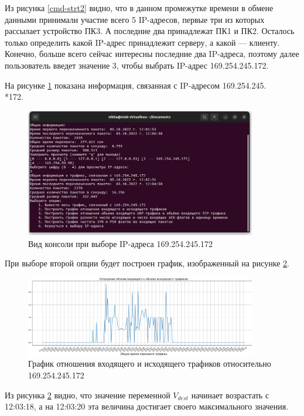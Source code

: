 \documentclass[bachelor, och, coursework]{SCWorks}
\begin{document}
  Из рисунка \ref{cmd-strt2} видно, что в данном промежутке времени в обмене данными принимали участие всего 5 IP-адресов, первые три из которых рассылает
  устройство ПК3. А последние два принадлежат ПК1 и ПК2. Осталось только определить какой IP-адрес принадлежит серверу, а какой --- клиенту. Конечно, больше
  всего сейчас интересны последние два IP-адреса, поэтому далее пользователь введет значение 3, чтобы выбрать IP-адрес 169.254.245.172.

  На рисунке \ref{chmod} показана информация, связанная с IP-адресом 169.254.245.\\*172.

  \begin{figure}[H]
    \centering
    \includegraphics[width=0.9\textwidth]{photo/choose-mode.jpg}
    \caption{Вид консоли при выборе IP-адреса 169.254.245.172}
    \label{chmod}
  \end{figure}

  При выборе второй опции будет построен график, изображенный на рисунке \ref{clnt1}.

  \begin{figure}[H]
    \centering
    \includegraphics[width=0.9\textwidth]{photo/clnt1.png}
    \caption{График отношения входящего и исходящего трафиков относительно 169.254.245.172}
    \label{clnt1}
  \end{figure}

  Из рисунка \ref{clnt1} видно, что значение переменной $V_{dest}$ начинает возрастать с 12:03:18, а на 12:03:20 эта величина достигает
  своего максимального значения.
\end{document}
